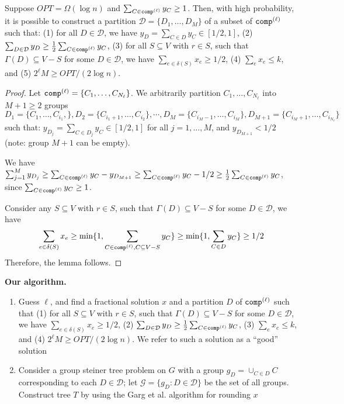 \begin{lemma}
\label{lemma:supergrp}
Suppose $OPT=\Omega(\log{n})$ and $\sum_{C\in\texttt{comp}^{(\ell)}} y_C\geq 1$.
Then, with high probability, it is possible to construct a partition $\mathcal{D}=\{D_1,\ldots,D_M\}$ of a subset of $\texttt{comp}^{(\ell)}$ such that:
(1) for all $D\in\mathcal{D}$, we have $y_D=\sum_{C\in D} y_C \in[1/2, 1]$,
(2) $\sum_{D\in\mathcal{D}} y_D \geq \frac{1}{2}\sum_{C\in\texttt{comp}^{(\ell)}} y_C$,
(3) for all $S\subseteq V$ with $r\in S$, such that $\Gamma(D) \subseteq V-S$ for some $D\in\mathcal{D}$,
we have $\sum_{e\in\delta(S)} x_e\geq 1/2$, 
(4) $\sum_e x_e\leq k$, and
(5) $2^{\ell}M\geq OPT/(2\log{n})$.
\end{lemma}
\begin{proof}
Let $\texttt{comp}^{(\ell)}=\{C_1,\ldots,C_{N_{\ell}}\}$. We arbitrarily partition $C_1,\ldots,C_{N_{\ell}}$ into $M+1\geq 2$ groups
$$D_1=\{C_1,\ldots,C_{i_1},\}, D_2=\{C_{i_1+1},\ldots,C_{i_2}\},\cdots,D_M=\{C_{i_M-1},\ldots,C_{i_M}\}, D_{M+1}=\{C_{i_M+1},\ldots, C_{i_{N_{\ell}}}\}$$ 
such that:
$y_{D_j}=\sum_{C\in D_j} y_{C}\in[1/2, 1]$ for all $j=1,\ldots,M$, and $y_{D_{M+1}}< 1/2$ (note: group $M+1$ can be empty).

We have $\sum_{j=1}^M y_{D_j}\geq \sum_{C\in\texttt{comp}^{(\ell)}} y_C - y_{D_{M+1}} \geq \sum_{C\in\texttt{comp}^{(\ell)}} y_C - 1/2 \geq \frac{1}{2}\sum_{C\in\texttt{comp}^{(\ell)}} y_C$,
since $\sum_{C\in\texttt{comp}^{(\ell)}} y_C\geq 1$. 

Consider any $S\subseteq V$ with $r\in S$, such that $\Gamma(D)\subseteq V-S$ for some $D\in\mathcal{D}$,
we have 
\[
\sum_{e\in\delta(S)} x_e \geq \min\{1, \sum_{C\in\texttt{comp}^{(\ell)}, C\subseteq V-S} y_C\}
\geq \min\{1, \sum_{C\in D} y_C\}\geq 1/2
\]
Therefore, the lemma follows.
\end{proof}

\noindent
\textbf{Our algorithm.}
\begin{enumerate}
\item
Guess $\ell$, and find a fractional solution $x$ and a partition $D$ of $\texttt{comp}^{(\ell)}$ such that
(1) for all $S\subseteq V$ with $r\in S$, such that $\Gamma(D) \subseteq V-S$ for some $D\in\mathcal{D}$,
we have $\sum_{e\in\delta(S)} x_e\geq 1/2$, 
(2) $\sum_{D\in\mathcal{D}} y_D \geq \frac{1}{2}\sum_{C\in\texttt{comp}^{(\ell)}} y_C$,
(3) $\sum_e x_e\leq k$, and
(4) $2^{\ell}M\geq OPT/(2\log{n})$.
We refer to such a solution as a ``good'' solution
\item
Consider a group steiner tree problem on $G$ with a group $g_D=\cup_{C\in D} C$ corresponding to each 
$D\in\mathcal{D}$; let $\mathcal{G}=\{g_D: D\in\mathcal{D}\}$ be the set of all groups.
Construct tree $T$ by using the Garg et al. algorithm for rounding $x$
\end{enumerate}


